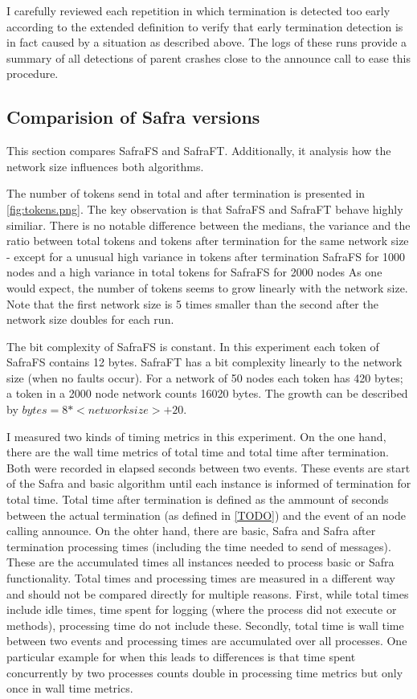 I carefully reviewed each repetition in which termination is detected too early according to the extended definition to verify that early termination detection is in fact caused by a situation as described above.
The logs of these runs provide a summary of all detections of parent crashes close to the announce call to ease this procedure.

\subsection{Comparision of Safra versions}
This section compares SafraFS and SafraFT. 
Additionally, it analysis how the network size influences both algorithms.

The number of tokens send in total and after termination is presented in \cref{fig:tokens.png}.
The key observation is that SafraFS and SafraFT behave highly similiar.
There is no notable difference between the medians, the variance and the ratio between total tokens and tokens after termination for the same network size - except for a unusual high variance in tokens after termination SafraFS for 1000 nodes and a high variance in total tokens for SafraFS for 2000 nodes %
As one would expect, the number of tokens seems to grow linearly with the network size.
Note that the first network size is 5 times smaller than the second after the network size doubles for each run.

The bit complexity of SafraFS is constant.
In this experiment each token of SafraFS contains 12 bytes.
SafraFT has a bit complexity linearly to the network size (when no faults occur).
For a network of 50 nodes each token has 420 bytes; a token in a 2000 node network counts 16020 bytes.
The growth can be described by $bytes = 8 * <network size> + 20$.

I measured two kinds of timing metrics in this experiment.
On the one hand, there are the wall time metrics of total time and total time after termination.
Both were recorded in elapsed seconds between two events. 
These events are start of the Safra and basic algorithm until each instance is informed of termination for total time. 
Total time after termination is defined as the ammount of seconds between the actual termination (as defined in \cref{TODO}) and the event of an node calling
announce. %
On the ohter hand, there are basic, Safra and Safra after termination processing times (including the time needed to send of messages).
These are the accumulated times all instances needed to process basic or Safra functionality.
Total times and processing times are measured in a different way and should not be compared directly for multiple reasons. 
First, while total times include idle times, time spent for logging (where the process did not execute or methods), processing time do not include these.
Secondly, total time is wall time between two events and processing times are accumulated over all processes. 
One particular example for when this leads to differences is that time spent concurrently by two processes counts double in processing time metrics but only once in wall time metrics.

